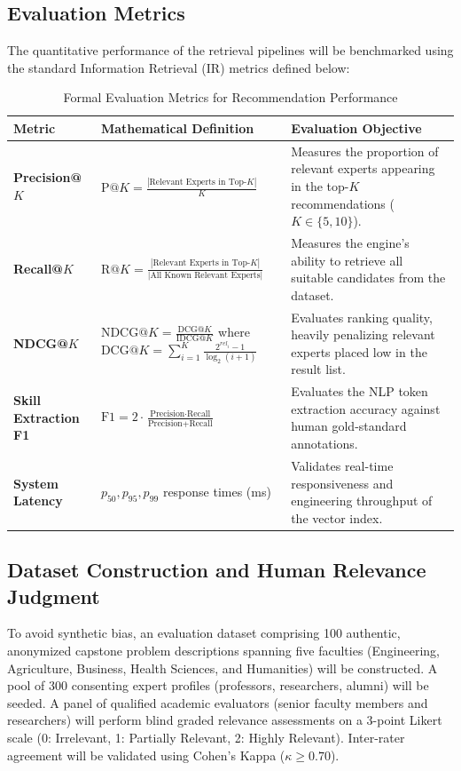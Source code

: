 \documentclass[11pt,a4paper]{article}
\begin{document}
\subsection{Evaluation Metrics}
The quantitative performance of the retrieval pipelines will be benchmarked using the standard Information Retrieval (IR) metrics defined below:

\begin{table}[htbp]
\centering
\small
\caption{Formal Evaluation Metrics for Recommendation Performance}
\label{tab:metrics}
\begin{tabularx}{\textwidth}{@{}l p{4.2cm} X@{}}
\toprule
\textbf{Metric} & \textbf{Mathematical Definition} & \textbf{Evaluation Objective} \\
\midrule
\textbf{Precision@$K$} & $\text{P}@K = \frac{|\text{Relevant Experts in Top-}K|}{K}$ & Measures the proportion of relevant experts appearing in the top-$K$ recommendations ($K \in \{5, 10\}$). \\
\addlinespace
\textbf{Recall@$K$} & $\text{R}@K = \frac{|\text{Relevant Experts in Top-}K|}{|\text{All Known Relevant Experts}|}$ & Measures the engine's ability to retrieve all suitable candidates from the dataset. \\
\addlinespace
\textbf{NDCG@$K$} & $\text{NDCG}@K = \frac{\text{DCG}@K}{\text{IDCG}@K}$ where $\text{DCG}@K = \sum_{i=1}^K \frac{2^{rel_i}-1}{\log_2(i+1)}$ & Evaluates ranking quality, heavily penalizing relevant experts placed low in the result list. \\
\addlinespace
\textbf{Skill Extraction F1} & $\text{F1} = 2 \cdot \frac{\text{Precision} \cdot \text{Recall}}{\text{Precision} + \text{Recall}}$ & Evaluates the NLP token extraction accuracy against human gold-standard annotations. \\
\addlinespace
\textbf{System Latency} & $p_{50}, p_{95}, p_{99}$ response times (ms) & Validates real-time responsiveness and engineering throughput of the vector index. \\
\bottomrule
\end{tabularx}
\end{table}

\subsection{Dataset Construction and Human Relevance Judgment}
To avoid synthetic bias, an evaluation dataset comprising 100 authentic, anonymized capstone problem descriptions spanning five faculties (Engineering, Agriculture, Business, Health Sciences, and Humanities) will be constructed. A pool of 300 consenting expert profiles (professors, researchers, alumni) will be seeded. 
A panel of qualified academic evaluators (senior faculty members and researchers) will perform blind graded relevance assessments on a 3-point Likert scale (0: Irrelevant, 1: Partially Relevant, 2: Highly Relevant). Inter-rater agreement will be validated using Cohen's Kappa ($\kappa \ge 0.70$).
\end{document}
